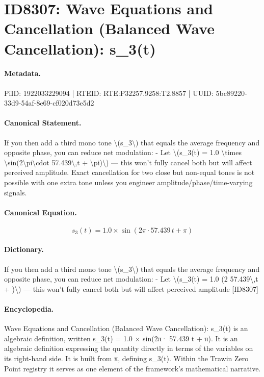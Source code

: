 \section*{ID8307: Wave Equations and Cancellation (Balanced Wave Cancellation): s\_3(t)}
\paragraph{Metadata.}
PiID: 1922033229094 | RTEID: RTE:P32257.9258:T2.8857 | UUID: 5bc89220-33d9-54af-8e69-cf020d73e5d2

\paragraph{Canonical Statement.}
If you then add a third mono tone \textbackslash{}(s\_3\textbackslash{}) that equals the average frequency and opposite phase, you can reduce net modulation: - Let \textbackslash{}(s\_3(t) = 1.0 \textbackslash{}times \textbackslash{}sin(2\textbackslash{}pi\textbackslash{}cdot 57.439\textbackslash{},t + \textbackslash{}pi)\textbackslash{}) — this won’t fully cancel both but will affect perceived amplitude. Exact cancellation for two close but non-equal tones is not possible with one extra tone unless you engineer amplitude/phase/time-varying signals.

\paragraph{Canonical Equation.}
\[
s_3(t) = 1.0 \times \sin(2\pi\cdot 57.439\,t + \pi)
\]

\paragraph{Dictionary.}
If you then add a third mono tone \textbackslash{}(s\_3\textbackslash{}) that equals the average frequency and opposite phase, you can reduce net modulation: - Let \textbackslash{}(s\_3(t) = 1.0 (2 57.439\textbackslash{},t + )\textbackslash{}) — this won’t fully cancel both but will affect perceived amplitude [ID8307]

\paragraph{Encyclopedia.}
Wave Equations and Cancellation (Balanced Wave Cancellation): s\_3(t) is an algebraic definition, written s\_3(t) = 1.0 × sin(2π· 57.439 t + π). It is an algebraic definition expressing the quantity directly in terms of the variables on its right-hand side. It is built from π, defining s\_3(t). Within the Trawin Zero Point registry it serves as one element of the framework's mathematical narrative.
